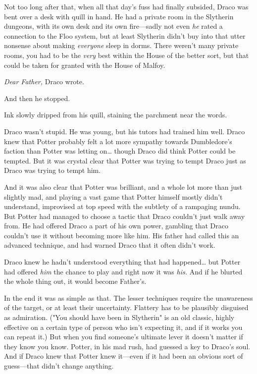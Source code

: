 Not too long after that, when all that day's fuss had finally subsided, Draco
was bent over a desk with quill in hand. He had a private room in the Slytherin
dungeons, with its own desk and its own fire---sadly not even \emph{he} rated a
connection to the Floo system, but at least Slytherin didn't buy into that
utter nonsense about making \emph{everyone} sleep in dorms. There weren't many
private rooms, you had to be the \emph{very} best within the House of the
better sort, but that could be taken for granted with the House of Malfoy.

\emph{Dear Father,} Draco wrote.

And then he stopped.

Ink slowly dripped from his quill, staining the parchment near the words.

Draco wasn't stupid. He was young, but his tutors had trained him well. Draco
knew that Potter probably felt a lot more sympathy towards Dumbledore's faction
than Potter was letting on{\ldots} though Draco did think Potter could be
tempted. But it was crystal clear that Potter was trying to tempt Draco just as
Draco was trying to tempt him.

And it was also clear that Potter was brilliant, and a whole lot more than just
slightly mad, and playing a vast game that Potter himself mostly didn't
understand, improvised at top speed with the subtlety of a rampaging nundu. But
Potter had managed to choose a tactic that Draco couldn't just walk away from.
He had offered Draco a part of his own power, gambling that Draco couldn't use
it without becoming more like him. His father had called this an advanced
technique, and had warned Draco that it often didn't work.

Draco knew he hadn't understood everything that had happened{\ldots} but Potter
had offered \emph{him} the chance to play and right now it was \emph{his.} And
if he blurted the whole thing out, it would become Father's.

In the end it was as simple as that. The lesser techniques require the
unawareness of the target, or at least their uncertainty. Flattery has to be
plausibly disguised as admiration. ("You should have been in Slytherin" is an
old classic, highly effective on a certain type of person who isn't expecting
it, and if it works you can repeat it.) But when you find someone's ultimate
lever it doesn't matter if they know you know. Potter, in his mad rush, had
guessed a key to Draco's soul. And if Draco knew that Potter knew it---even if
it had been an obvious sort of guess---that didn't change anything.


